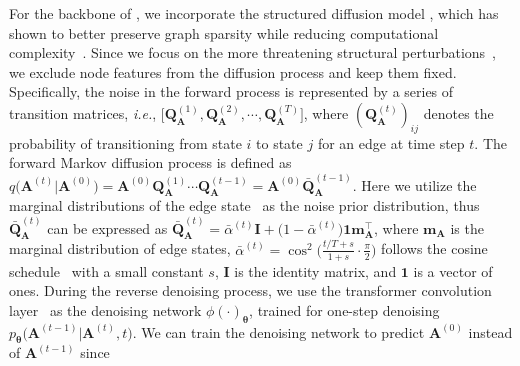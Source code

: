 For the backbone of \ModelName, we incorporate the structured diffusion model \cite{austin2021structured, vignac2022digress, li2023graphmaker}, which has shown to better preserve graph sparsity while reducing computational complexity~\cite{vignac2022digress, haefeli2022diffusion}. Since we focus on the more threatening structural perturbations~\cite{zugner2018adversarial}, we exclude node features from the diffusion process and keep them fixed.
Specifically, the noise in the forward process is represented by a series of transition matrices, \textit{i.e.}, $\big[\mathbf{Q}_{\mathbf{A}}^{(1)}, \mathbf{Q}_{\mathbf{A}}^{(2)}, \cdots, \mathbf{Q}_{\mathbf{A}}^{(T)}\big]$, where $(\mathbf{Q}_{\mathbf{A}}^{(t)})_{ij}$ denotes the probability of transitioning from state $i$ to state $j$ for an edge at time step $t$. 
The forward Markov diffusion process is defined as $q\big(\mathbf{A}^{(t)}|\mathbf{A}^{(0)}\big)=\mathbf{A}^{(0)}\mathbf{Q}_{\mathbf{\mathbf{A}}}^{(1)}\cdots \mathbf{Q}_{\mathbf{A}}^{(t-1)}=\mathbf{A}^{(0)}\bar{\mathbf{Q}}^{(t-1)}_{\mathbf{A}}$.
Here we utilize the marginal distributions of the edge state~\cite{vignac2022digress} as the noise prior distribution, thus $\bar{\mathbf{Q}}_{\mathbf{A}}^{(t)}$ can be expressed as $\bar{\mathbf{Q}}_{\mathbf{A}}^{(t)}=\bar{\alpha}^{(t)}\mathbf{I}+\big(1-\bar{\alpha}^{(t)}\big)\mathbf{1} \mathbf{m}_{\mathbf{A}}^{\top}$, where $\mathbf{m}_{\mathbf{A}}$ is the marginal distribution of edge states, $\bar{\alpha}^{(t)}=\cos^2\big(\frac{t/T+s}{1+s}\cdot \frac{\pi}{2}\big)$ follows the cosine schedule~\cite{nichol2021improved} with a small constant $s$, $\mathbf{I}$ is the identity matrix, and $\mathbf{1}$ is a vector of ones.
During the reverse denoising process, we use the transformer convolution layer~\cite{shi2020masked} as the denoising network $\phi(\cdot)_{\boldsymbol{\theta}}$, trained for one-step denoising $p_{\boldsymbol{\theta}}\big(\mathbf{A}^{(t-1)}|\mathbf{A}^{(t)}, t\big)$. 
We can train the denoising network to predict $\mathbf{A}^{(0)}$ instead of $\mathbf{A}^{(t-1)}$ since 
